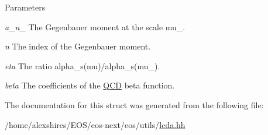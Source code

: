 \begin{DoxyParams}{Parameters}
\item[{\em a\_\-n\_\-0}]The Gegenbauer moment at the scale mu\_. \item[{\em n}]The index of the Gegenbauer moment. \item[{\em eta}]The ratio alpha\_\-s(mu)/alpha\_\-s(mu\_). \item[{\em beta}]The coefficients of the \hyperlink{classeos_1_1QCD}{QCD} beta function. \end{DoxyParams}


The documentation for this struct was generated from the following file:\begin{DoxyCompactItemize}
\item 
/home/alexshires/EOS/eos-\/next/eos/utils/\hyperlink{lcda_8hh}{lcda.hh}\end{DoxyCompactItemize}
